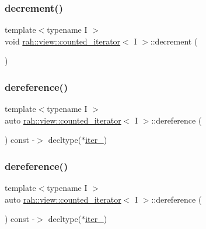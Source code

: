 \subsubsection{\texorpdfstring{decrement()}{decrement()}\hspace{0.1cm}{\footnotesize\ttfamily [2/2]}}
{\footnotesize\ttfamily template$<$typename I $>$ \\
void \mbox{\hyperlink{structrah_1_1view_1_1counted__iterator}{rah\+::view\+::counted\+\_\+iterator}}$<$ I $>$\+::decrement (\begin{DoxyParamCaption}{ }\end{DoxyParamCaption})\hspace{0.3cm}{\ttfamily [inline]}}

\mbox{\label{structrah_1_1view_1_1counted__iterator_aa0478a9f3d2083f2cd9c42d32e8e4dd5}} 
\subsubsection{\texorpdfstring{dereference()}{dereference()}\hspace{0.1cm}{\footnotesize\ttfamily [1/2]}}
{\footnotesize\ttfamily template$<$typename I $>$ \\
auto \mbox{\hyperlink{structrah_1_1view_1_1counted__iterator}{rah\+::view\+::counted\+\_\+iterator}}$<$ I $>$\+::dereference (\begin{DoxyParamCaption}{ }\end{DoxyParamCaption}) const -\/$>$ decltype($\ast$\mbox{\hyperlink{structrah_1_1view_1_1counted__iterator_a907dba6ac64293e4c5718e522da4972e}{iter\+\_\+}}) \hspace{0.3cm}{\ttfamily [inline]}}

\mbox{\label{structrah_1_1view_1_1counted__iterator_aa0478a9f3d2083f2cd9c42d32e8e4dd5}} 
\subsubsection{\texorpdfstring{dereference()}{dereference()}\hspace{0.1cm}{\footnotesize\ttfamily [2/2]}}
{\footnotesize\ttfamily template$<$typename I $>$ \\
auto \mbox{\hyperlink{structrah_1_1view_1_1counted__iterator}{rah\+::view\+::counted\+\_\+iterator}}$<$ I $>$\+::dereference (\begin{DoxyParamCaption}{ }\end{DoxyParamCaption}) const -\/$>$ decltype($\ast$\mbox{\hyperlink{structrah_1_1view_1_1counted__iterator_a907dba6ac64293e4c5718e522da4972e}{iter\+\_\+}}) \hspace{0.3cm}{\ttfamily [inline]}}

